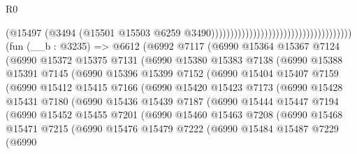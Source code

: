 \begin{lexlean}{R0}
\begin{coremodule}
                                                                        (@15497
                                                                          (@3494
                                                                            (@15501
                                                                              @15503
                                                                              @6259
                                                                              @3490)))))))))))))))))))))))))))))))))))))
    (fun (__b : @3235) =>
    @6612
      (@6992
        @7117
        (@6990
          @15364
          @15367
          @7124
          (@6990
            @15372
            @15375
            @7131
            (@6990
              @15380
              @15383
              @7138
              (@6990
                @15388
                @15391
                @7145
                (@6990
                  @15396
                  @15399
                  @7152
                  (@6990
                    @15404
                    @15407
                    @7159
                    (@6990
                      @15412
                      @15415
                      @7166
                      (@6990
                        @15420
                        @15423
                        @7173
                        (@6990
                          @15428
                          @15431
                          @7180
                          (@6990
                            @15436
                            @15439
                            @7187
                            (@6990
                              @15444
                              @15447
                              @7194
                              (@6990
                                @15452
                                @15455
                                @7201
                                (@6990
                                  @15460
                                  @15463
                                  @7208
                                  (@6990
                                    @15468
                                    @15471
                                    @7215
                                    (@6990
                                      @15476
                                      @15479
                                      @7222
                                      (@6990
                                        @15484
                                        @15487
                                        @7229
                                        (@6990

\end{coremodule}
\end{lexlean}
